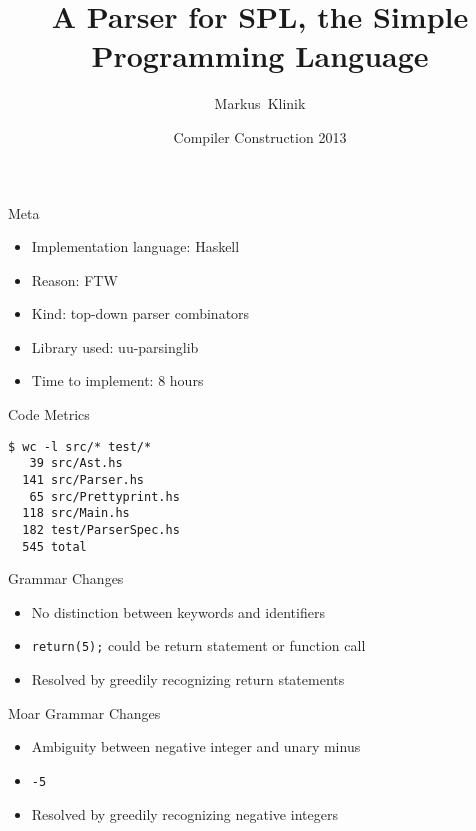\documentclass{beamer}
\title
{A Parser for SPL, the Simple Programming Language}
\author
{Markus~Klinik}
\institute[Radboud University Nijmegen] %
{
  Radboud University Nijmegen
}
\date
{Compiler Construction 2013}
\begin{document}
\begin{frame}
  \titlepage
\end{frame}

\begin{frame}{Meta}

  \begin{itemize}
    \item Implementation language: Haskell
    \item Reason: FTW
    \item Kind: top-down parser combinators
    \item Library used: uu-parsinglib
    \item Time to implement: 8 hours
  \end{itemize}

\end{frame}


\begin{frame}[fragile]{Code Metrics}

\begin{verbatim}
$ wc -l src/* test/*
   39 src/Ast.hs
  141 src/Parser.hs
   65 src/Prettyprint.hs
  118 src/Main.hs
  182 test/ParserSpec.hs
  545 total
\end{verbatim}

\end{frame}


\begin{frame}{Grammar Changes}

\begin{itemize}
  \item No distinction between keywords and identifiers
  \item \texttt{return(5);} could be return statement or function call
  \item Resolved by greedily recognizing return statements
\end{itemize}

\end{frame}


\begin{frame}{Moar Grammar Changes}

\begin{itemize}
  \item Ambiguity between negative integer and unary minus
  \item \texttt{-5}
  \item Resolved by greedily recognizing negative integers
\end{itemize}

\end{frame}
\end{document}
